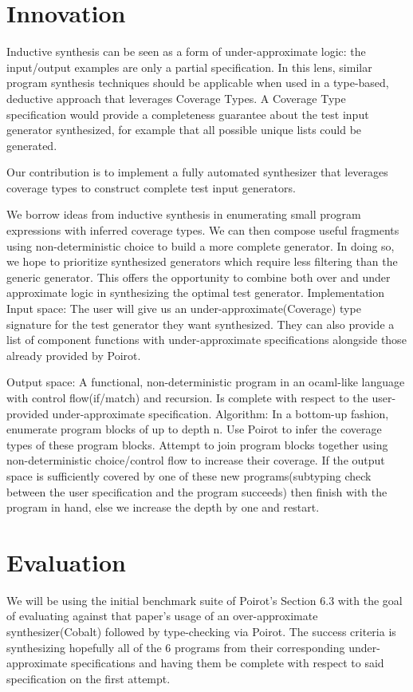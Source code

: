 \documentclass[review, sigplan]{acmart}
\begin{document}
\section{Innovation}

Inductive synthesis can be seen as a form of under-approximate logic: the input/output examples are only a partial specification. In this lens, similar program synthesis techniques should be applicable when used in a type-based, deductive approach that leverages Coverage Types. A Coverage Type specification would provide a completeness guarantee about the test input generator synthesized, for example that all possible unique lists could be generated.

Our contribution is to implement a fully automated synthesizer that leverages coverage types to construct complete test input generators.

We borrow ideas from inductive synthesis in enumerating small program expressions with inferred coverage types. We can then compose useful fragments using non-deterministic choice to build a more complete generator. In doing so, we hope to prioritize synthesized generators which require less filtering than the generic generator. This offers the opportunity to combine both over and under approximate logic in synthesizing the optimal test generator.
Implementation
Input space: The user will give us an under-approximate(Coverage) type signature for the test generator they want synthesized. They can also provide a list of component functions with under-approximate specifications alongside those already provided by Poirot.

Output space: A functional, non-deterministic program in an ocaml-like language with control flow(if/match) and recursion. Is complete with respect to the user-provided under-approximate specification.
Algorithm:
In a bottom-up fashion, enumerate program blocks of up to depth n.
Use Poirot to infer the coverage types of these program blocks.
Attempt to join program blocks together using non-deterministic choice/control flow to increase their coverage.
If the output space is sufficiently covered by one of these new programs(subtyping check between the user specification and the program succeeds) then finish with the program in hand, else we increase the depth by one and restart.
\section{Evaluation}
We will be using the initial benchmark suite of Poirot's Section 6.3 with the goal of evaluating against that paper's usage of an over-approximate synthesizer(Cobalt) followed by type-checking via Poirot. The success criteria is synthesizing hopefully all of the 6 programs from their corresponding under-approximate specifications and having them be complete with respect to said specification on the first attempt.
\end{document}

